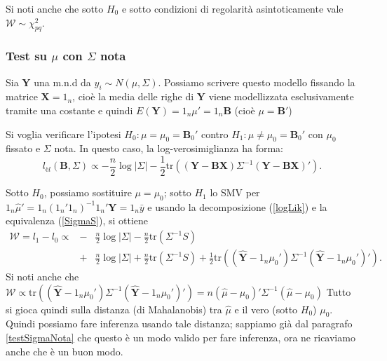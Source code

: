 \documentclass[10pt]{article}
\newcommand{\bfB}{\mathbf{B}}
\newcommand{\tr}{\mathrm{tr}}
\newcommand{\XX}{\mathbf{X}}
\newcommand{\YY}{\mathbf{Y}}
\begin{document}
Si noti anche che sotto $H_0$ e sotto condizioni di regolarità asintoticamente vale $\mathcal{W}\sim \chi^2_{pq}$.



\subsubsection{Test su $\mu$ con $\Sigma$ nota}
Sia $\YY$ una m.n.d da $y_i \sim N(\mu,\Sigma)$.
Possiamo scrivere questo modello fissando la matrice $\XX=1_{n}$, cioè la media delle righe di $\YY$ viene modellizzata esclusivamente tramite una costante 
e quindi $E(\YY)=1_n\mu'=1_n\bfB$ (cioè $\mu=\bfB'$)

Si voglia verificare l'ipotesi $H_0: \mu=\mu_0=\bfB_0'$ contro $H_1: \mu\neq\mu_0=\bfB_0'$ con $\mu_0$ fissato e $\Sigma$ nota.
In questo caso, la log-verosimiglianza ha forma:
$$l_{èl}(\bfB,\Sigma) \propto 
-\frac{n}{2}\log|\Sigma|-\frac{1}{2}\tr\left((\YY -\bfB\XX)\Sigma^{-1}(\YY -\bfB\XX)'\right).$$

Sotto $H_0$, possiamo sostituire $\mu=\mu_0$; sotto $H_1$ lo SMV per $1_n\hat{\mu}'=1_n(1_n'1_n)^{-1}1_n'\YY= 1_n\bar{y}$ e usando la
decomposizione (\ref{logLik}) e la equivalenza (\ref{SigmaS}), si ottiene 
\begin{eqnarray*}
\mathcal{W}= l_{1}- l_{0} \propto 
&-&\frac{n}{2} \log|\Sigma|   -\frac{n}{2} \tr(\Sigma^{-1}S)  \\
&+&\frac{n}{2} \log|\Sigma|   +\frac{n}{2} \tr(\Sigma^{-1}S) 
+\frac{1}{2} \tr\left( (\hat{\YY}-1_n\mu_0')\Sigma^{-1}(\hat{\YY}-1_n\mu_0')' \right).
\end{eqnarray*}
Si noti anche che $\mathcal{W}\propto \tr\left( (\hat{\YY}-1_n\mu_0')\Sigma^{-1}(\hat{\YY}-1_n\mu_0')' \right)=n (\hat{\mu}-\mu_0)'\Sigma^{-1}(\hat{\mu}-\mu_0)$
Tutto si gioca quindi sulla distanza (di Mahalanobis) tra $\hat{\mu}$ e il vero (sotto $H_0$) $\mu_0$.
Quindi possiamo fare inferenza usando tale distanza; sappiamo già dal paragrafo \ref{testSigmaNota} che questo è un modo valido per fare inferenza, 
ora ne ricaviamo anche che è un buon modo.
\end{document}
